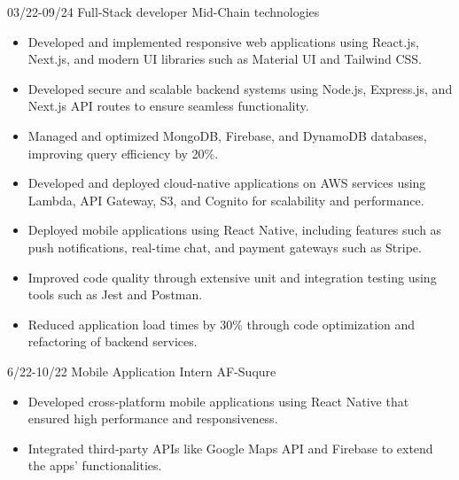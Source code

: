 \documentclass[9pt]{developercv}
\begin{document}
\vspace{-10 pt}
\begin{entrylist}
    \entry
    {03/22-09/24}
    {Full-Stack developer}
    {Mid-Chain technologies}
    {\vspace{-10pt}
        \begin{itemize}[noitemsep,topsep=0pt,parsep=0pt,partopsep=0pt, leftmargin=-1pt]
            \item {Developed and implemented responsive web applications using React.js, Next.js, and modern UI libraries such as Material UI and Tailwind CSS.}
            \item {Developed secure and scalable backend systems using Node.js, Express.js, and Next.js API routes to ensure seamless functionality.}
            \item {Managed and optimized MongoDB, Firebase, and DynamoDB databases, improving query efficiency by 20\%.}
            \item {Developed and deployed cloud-native applications on AWS services using Lambda, API Gateway, S3, and Cognito for scalability and performance.}
            \item {Deployed mobile applications using React Native, including features such as push notifications, real-time chat, and payment gateways such as Stripe.}
            \item {Improved code quality through extensive unit and integration testing using tools such as Jest and Postman.}

            \item {Reduced application load times by 30\% through code optimization and refactoring of backend services.}

        \end{itemize}
    }
    \entry
    {6/22-10/22}
    {Mobile Application Intern}
    {AF-Suqure}
    {\vspace{-10pt}
        \begin{itemize}[noitemsep,topsep=0pt,parsep=0pt,partopsep=0pt, leftmargin=-1pt]
            \item {Developed cross-platform mobile applications using React Native that ensured high performance and responsiveness.}

            \item {Integrated third-party APIs like Google Maps API and Firebase to extend the apps’ functionalities.}


\end{itemize}}
\end{entrylist}
\end{document}
